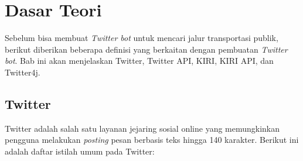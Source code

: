 \chapter{Dasar Teori}
\label{chap:dasar teori}

Sebelum bisa membuat \textit{Twitter bot} untuk mencari jalur transportasi publik, berikut diberikan beberapa definisi yang berkaitan dengan pembuatan \textit{Twitter bot}. Bab ini akan menjelaskan Twitter, Twitter API, KIRI, KIRI API, dan Twitter4j.

\section{Twitter \cite{TwitterBook}}
\label{sec:twitter}

Twitter adalah salah satu layanan jejaring sosial online yang memungkinkan pengguna melakukan \textit{posting} pesan berbasis teks hingga 140 karakter. Berikut ini adalah daftar istilah umum pada Twitter:


